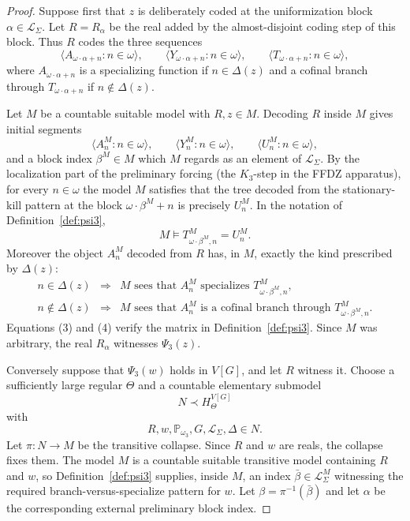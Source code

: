 \documentclass[11pt]{article}
\theoremstyle{plain}
\theoremstyle{definition}
\theoremstyle{remark}
\newcommand{\Pp}{\mathbb P}
\newcommand{\PsiThree}{\Psi_{3}}
\begin{document}
\begin{proof}
Suppose first that $z$ is deliberately coded at the uniformization block
$\alpha\in\mathcal L_{\Sigma}$.  Let $R=R_\alpha$ be the real added by the
almost-disjoint coding step of this block.  Thus $R$ codes the three sequences
\[
\langle A_{\omega\cdot\alpha+n}:n\in\omega\rangle,
\qquad
\langle Y_{\omega\cdot\alpha+n}:n\in\omega\rangle,
\qquad
\langle T_{\omega\cdot\alpha+n}:n\in\omega\rangle,
\]
where $A_{\omega\cdot\alpha+n}$ is a specializing function if $n\in\Delta(z)$ and a
cofinal branch through $T_{\omega\cdot\alpha+n}$ if $n\notin\Delta(z)$.

Let $M$ be a countable suitable model with $R,z\in M$.  Decoding $R$ inside $M$ gives
initial segments
\[
\langle A^M_n:n\in\omega\rangle,
\qquad
\langle Y^M_n:n\in\omega\rangle,
\qquad
\langle U^M_n:n\in\omega\rangle,
\]
and a block index $\beta^M\in M$ which $M$ regards as an element of
$\mathcal L_{\Sigma}$.  By the localization part of the preliminary forcing
(the $K_3$-step in the FFDZ apparatus), for every $n\in\omega$ the model $M$ satisfies
that the tree decoded from the stationary-kill pattern at the block
$\omega\cdot\beta^M+n$ is precisely $U^M_n$.  In the notation of Definition~\ref{def:psi3},
\[
M\models
T^M_{\omega\cdot\beta^M,n}=U^M_n.              \tag{3}
\]
Moreover the object $A^M_n$ decoded from $R$ has, in $M$, exactly the kind prescribed by
$\Delta(z)$:
\[
\begin{array}{rcl}
n\in\Delta(z)     &\Longrightarrow& M\text{ sees that }A^M_n\text{ specializes }T^M_{\omega\cdot\beta^M,n},\\[2mm]
n\notin\Delta(z) &\Longrightarrow& M\text{ sees that }A^M_n\text{ is a cofinal branch through }T^M_{\omega\cdot\beta^M,n}.
\end{array}                                      \tag{4}
\]
Equations (3) and (4) verify the matrix in Definition~\ref{def:psi3}.  Since $M$ was
arbitrary, the real $R_\alpha$ witnesses $\PsiThree(z)$.

Conversely suppose that $\PsiThree(w)$ holds in $V[G]$, and let $R$ witness it.
Choose a sufficiently large regular $\Theta$ and a countable elementary submodel
\[
N\prec H_\Theta^{V[G]}
\]
with
\[
R,w,\Pp_{\omega_3},G,\mathcal L_{\Sigma},\Delta\in N.
\]
Let $\pi:N\to M$ be the transitive collapse.  Since $R$ and $w$ are reals, the
collapse fixes them.  The model $M$ is a countable suitable transitive model
containing $R$ and $w$, so Definition~\ref{def:psi3} supplies, inside $M$, an
index $\bar\beta\in\mathcal L_{\Sigma}^M$ witnessing the required
branch-versus-specialize pattern for $w$.  Let $\beta=\pi^{-1}(\bar\beta)$ and
let $\alpha$ be the corresponding external preliminary block index.


\end{proof}
\end{document}
